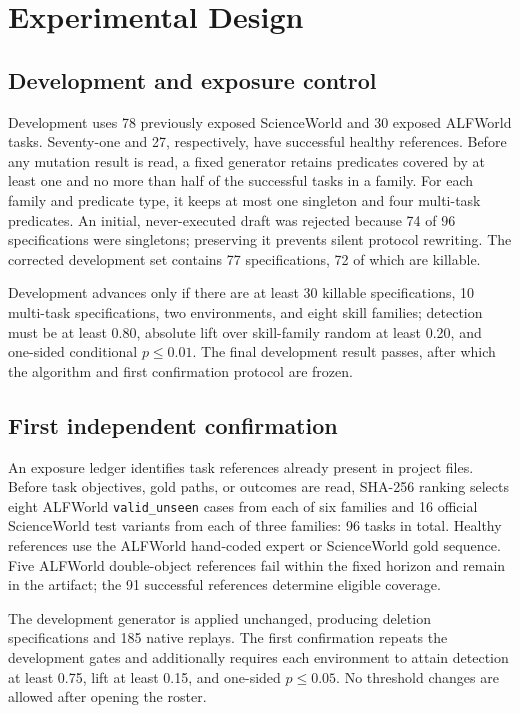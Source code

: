 \documentclass[10pt]{article}
\begin{document}
\section{Experimental Design}
\subsection{Development and exposure control}
Development uses 78 previously exposed ScienceWorld and 30 exposed ALFWorld tasks. Seventy-one and 27, respectively, have successful healthy references. Before any mutation result is read, a fixed generator retains predicates covered by at least one and no more than half of the successful tasks in a family. For each family and predicate type, it keeps at most one singleton and four multi-task predicates. An initial, never-executed draft was rejected because 74 of 96 specifications were singletons; preserving it prevents silent protocol rewriting. The corrected development set contains 77 specifications, 72 of which are killable.

Development advances only if there are at least 30 killable specifications, 10 multi-task specifications, two environments, and eight skill families; detection must be at least 0.80, absolute lift over skill-family random at least 0.20, and one-sided conditional $p\leq0.01$. The final development result passes, after which the algorithm and first confirmation protocol are frozen.

\subsection{First independent confirmation}
An exposure ledger identifies task references already present in project files. Before task objectives, gold paths, or outcomes are read, SHA-256 ranking selects eight ALFWorld \texttt{valid\_unseen} cases from each of six families and 16 official ScienceWorld test variants from each of three families: 96 tasks in total. Healthy references use the ALFWorld hand-coded expert or ScienceWorld gold sequence. Five ALFWorld double-object references fail within the fixed horizon and remain in the artifact; the 91 successful references determine eligible coverage.

The development generator is applied unchanged, producing \RXXIIISpecs{} deletion specifications and 185 native replays. The first confirmation repeats the development gates and additionally requires each environment to attain detection at least 0.75, lift at least 0.15, and one-sided $p\leq0.05$. No threshold changes are allowed after opening the roster.
\end{document}
